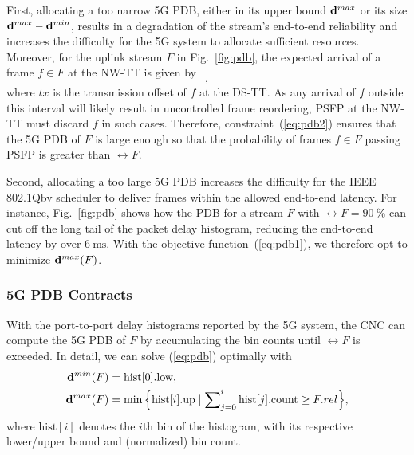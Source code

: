 

First, allocating a too narrow 5G PDB, either in its upper bound $\dpdbmax{}$ or its size $\dpdbmax{} - \dpdbmin{}$, results in a degradation of the stream's end-to-end reliability and increases the difficulty for the 5G system to allocate sufficient resources.
Moreover, for the uplink stream $F$ in Fig.~\ref{fig:pdb}, the expected arrival of a frame $f \in F$ at the NW-TT is given by
\begin{equation*}
  [tx + \dpdbmin{F}, tx + \dpdbmax{F}],
\end{equation*}
where $tx$ is the transmission offset of $f$ at the DS-TT.
As any arrival of $f$ outside this interval will likely result in uncontrolled frame reordering, PSFP at the NW-TT must discard $f$ in such cases.
Therefore, constraint~(\ref{eq:pdb2}) ensures that the 5G PDB of $F$ is large enough so that the probability of frames $f \in F$ passing PSFP is greater than $\rel{F}$.

Second, allocating a too large 5G PDB increases the difficulty for the IEEE 802.1Qbv scheduler to deliver frames within the allowed end-to-end latency.
For instance, Fig.~\ref{fig:pdb} shows how the PDB for a stream $F$ with $\rel{F} = \qty{90}{\percent}$ can cut off the long tail of the packet delay histogram, reducing the end-to-end latency by over $\qty{6}{\ms}$.
With the objective function~(\ref{eq:pdb1}), we therefore opt to minimize $\dpdbmax{F}$.

\subsubsection{5G PDB Contracts}
With the port-to-port delay histograms reported by the 5G system, the CNC can compute the 5G PDB of $F$ by accumulating the bin counts until $\rel{F}$ is exceeded. 
In detail, we can solve (\ref{eq:pdb}) optimally with
\begin{align*}
  \dpdbmin{F} &= \text{hist}[0].\text{low}, \\
  \dpdbmax{F} &= \min\Big\{\text{hist}[i].\text{up} \mid \sum\nolimits_{j=0}^{i} \text{hist}[j].\text{count} \geq \rel{F}\Big\},
\end{align*}
where $\text{hist}[i]$ denotes the $i$th bin of the histogram, with its respective lower/upper bound and (normalized) bin count.

